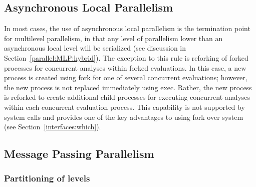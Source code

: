 \subsection{Asynchronous Local Parallelism}\label{parallel:MLP:local}

In most cases, the use of asynchronous local parallelism is the
termination point for multilevel parallelism, in that any level of
parallelism lower than an asynchronous local level will be serialized
(see discussion in Section~\ref{parallel:MLP:hybrid}).  The exception
to this rule is reforking of forked processes for concurrent analyses
within forked evaluations.  In this case, a new process is created
using fork for one of several concurrent evaluations; however, the new
process is not replaced immediately using exec.  Rather, the new
process is reforked to create additional child processes for executing
concurrent analyses within each concurrent evaluation process.  This
capability is not supported by system calls and provides one of the
key advantages to using fork over system (see
Section~\ref{interfaces:which}).

\subsection{Message Passing Parallelism}\label{parallel:MLP:message}

\subsubsection{Partitioning of levels}\label{parallel:MLP:message:partitioning}

